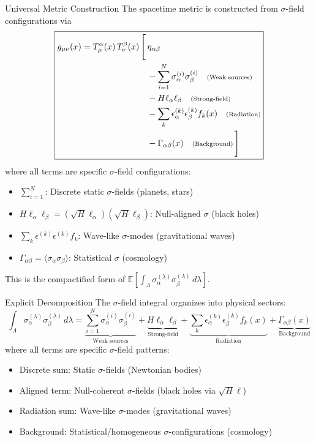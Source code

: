 \documentclass[11pt,a4paper]{article}
\theoremstyle{definition}
\theoremstyle{remark}
\begin{document}
		Universal Metric Construction
			The spacetime metric is constructed from $\sigma$-field configurations via
			\begin{equation}
				\boxed{
					\begin{aligned}
						g_{\mu\nu}(x) = T^\alpha_\mu(x) \, T^\beta_\nu(x) \, \Bigg[ \, &\eta_{\alpha\beta} \\
						&- \sum_{i=1}^{N} \sigma_\alpha^{(i)} \sigma_\beta^{(i)} \quad \text{\scriptsize(Weak sources)}\\
						&- H \ell_\alpha \ell_\beta \quad \text{\scriptsize(Strong-field)}\\
						&- \sum_{k} \epsilon_\alpha^{(k)} \epsilon_\beta^{(k)} f_k(x) \quad \text{\scriptsize(Radiation)}\\
						&- \Gamma_{\alpha\beta}(x) \quad \text{\scriptsize(Background)} \, \Bigg]
					\end{aligned}
				}
			\end{equation}
			where all terms are specific $\sigma$-field configurations:
			\begin{itemize}
				\item $\sum_{i=1}^N$: Discrete static $\sigma$-fields (planets, stars)
				\item $H\ell_\alpha\ell_\beta = (\sqrt{H}\ell_\alpha)(\sqrt{H}\ell_\beta)$: Null-aligned $\sigma$ (black holes)
				\item $\sum_k \epsilon^{(k)}\epsilon^{(k)} f_k$: Wave-like $\sigma$-modes (gravitational waves)
				\item $\Gamma_{\alpha\beta} = \langle\sigma_\alpha\sigma_\beta\rangle$: Statistical $\sigma$ (cosmology)
			\end{itemize}
			This is the compactified form of $\mathbb{E}[\int_\Lambda \sigma_\alpha^{(\lambda)} \sigma_\beta^{(\lambda)} \, d\lambda]$.
		
		Explicit Decomposition
			The $\sigma$-field integral organizes into physical sectors:
			\begin{equation}
				\int_\Lambda \sigma_\alpha^{(\lambda)} \sigma_\beta^{(\lambda)} \, d\lambda = \underbrace{\sum_{i=1}^N \sigma_\alpha^{(i)} \sigma_\beta^{(i)}}_{\text{Weak sources}} + \underbrace{H \ell_\alpha \ell_\beta}_{\text{Strong-field}} + \underbrace{\sum_k \epsilon_\alpha^{(k)} \epsilon_\beta^{(k)} f_k(x)}_{\text{Radiation}} + \underbrace{\Gamma_{\alpha\beta}(x)}_{\text{Background}}
			\end{equation}
			where all terms are specific $\sigma$-field patterns:
			\begin{itemize}
				\item Discrete sum: Static $\sigma$-fields (Newtonian bodies)
				\item Aligned term: Null-coherent $\sigma$-fields (black holes via $\sqrt{H}\ell$)
				\item Radiation sum: Wave-like $\sigma$-modes (gravitational waves)
				\item Background: Statistical/homogeneous $\sigma$-configurations (cosmology)
			\end{itemize}
		
\end{document}
